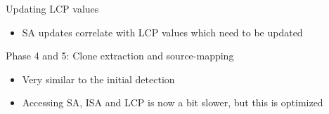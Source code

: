 \documentclass[aspectratio=1610, xcolor=table]{beamer}
\begin{document}
\begin{frame}[fragile]{Updating LCP values}
    \begin{itemize}
        \item SA updates correlate with LCP values which need to be updated
    \end{itemize}
    \begin{table}[t]
	\begin{center}
	\end{center}
	\label{tab:lcpupdates}
\end{table}
\end{frame}

\begin{frame}[fragile]{Phase 4 and 5: Clone extraction and source-mapping}
    \begin{itemize}
        \item Very similar to the initial detection
        \item Accessing SA, ISA and LCP is now a bit slower, but this is optimized
    \end{itemize}
\end{frame}
\end{document}

